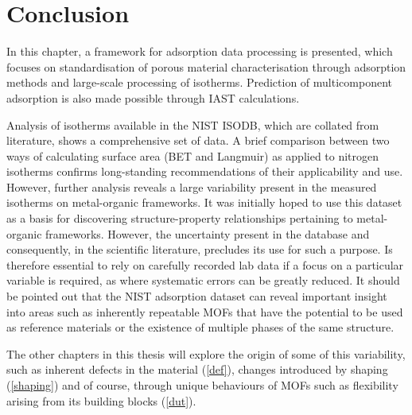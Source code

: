 
\section{Conclusion}

In this chapter, a framework for adsorption data processing is
presented, which focuses on standardisation of porous material
characterisation through adsorption methods and large-scale
processing of isotherms. Prediction of multicomponent
adsorption is also made possible through \gls{IAST} calculations.

Analysis of isotherms available in the \gls{NIST} ISODB, which are collated
from literature, shows a comprehensive set of data. A brief comparison
between two ways of calculating surface area (\gls{BET} and Langmuir) as applied
to nitrogen isotherms confirms long-standing recommendations of their
applicability and use. However, further analysis reveals a large
variability present in the measured isotherms on metal-organic
frameworks. It was initially hoped to use this dataset as a basis
for discovering structure-property relationships pertaining to 
metal-organic frameworks. However, the uncertainty present in the database
and consequently, in the scientific literature, precludes its 
use for such a purpose. Is therefore essential to rely on carefully
recorded lab data if a focus on a particular variable is required,
as where systematic errors can be greatly reduced.
It should be pointed out that the \gls{NIST} adsorption dataset can reveal
important insight into areas such as inherently repeatable
\glspl{MOF} that have the potential to be used as reference materials or the
existence of multiple phases of the same structure.

The other chapters in this thesis will explore the origin of some of
this variability, such as inherent defects in the material (\autoref{def}),
changes introduced by shaping (\autoref{shaping}) and of course, through
unique behaviours of \glspl{MOF} such as flexibility arising from its building
blocks (\autoref{dut}).

\FloatBarrier%
\pagebreak